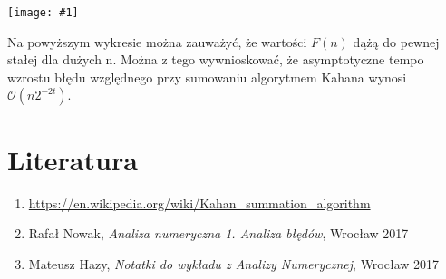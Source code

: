 \documentclass{article}
\newcommand{\plot}[1] {
	\texttt{[image: \#1]}
}
\begin{document}
	\plot{kahan.png}
	
	Na powyższym wykresie można zauważyć, że wartości $F(n)$ dążą do pewnej stałej dla dużych n. Można z tego wywnioskować, że asymptotyczne tempo wzrostu błędu względnego przy sumowaniu algorytmem Kahana wynosi $ \mathcal{O}(n  2^{-2t}) $.
	
\section{Literatura}

\begin{enumerate}
	\item \url{https://en.wikipedia.org/wiki/Kahan_summation_algorithm}
	\item Rafał Nowak, \textit{Analiza numeryczna 1. Analiza błędów}, Wrocław 2017
	\item Mateusz Hazy, \textit{Notatki do wykładu z Analizy Numerycznej}, Wrocław 2017
\end{enumerate}
\end{document}
